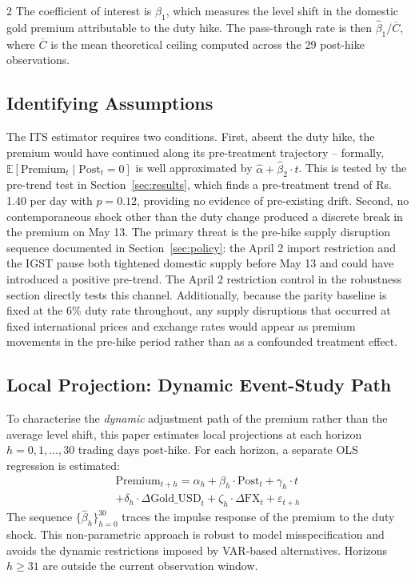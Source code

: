 \documentclass[12pt]{article}
\begin{document}
\begin{multicols}{2}
The coefficient of interest is $\beta_1$, which measures the level shift in the domestic gold premium attributable to the duty hike. The pass-through rate is then $\hat{\beta}_1 / \overline{C}$, where $\overline{C}$ is the mean theoretical ceiling computed across the 29 post-hike observations.

\subsection*{Identifying Assumptions}

The ITS estimator requires two conditions. First, absent the duty hike, the premium would have continued along its pre-treatment trajectory -- formally, $\mathbb{E}[\text{Premium}_t \mid \text{Post}_t = 0]$ is well approximated by $\hat{\alpha} + \hat{\beta}_2 \cdot t$. This is tested by the pre-trend test in Section~\ref{sec:results}, which finds a pre-treatment trend of Rs.\,1.40 per day with $p = 0.12$, providing no evidence of pre-existing drift. Second, no contemporaneous shock other than the duty change produced a discrete break in the premium on May 13. The primary threat is the pre-hike supply disruption sequence documented in Section~\ref{sec:policy}: the April 2 import restriction and the IGST pause both tightened domestic supply before May 13 and could have introduced a positive pre-trend. The April 2 restriction control in the robustness section directly tests this channel. Additionally, because the parity baseline is fixed at the 6\% duty rate throughout, any supply disruptions that occurred at fixed international prices and exchange rates would appear as premium movements in the pre-hike period rather than as a confounded treatment effect.

\subsection*{Local Projection: Dynamic Event-Study Path}

To characterise the \emph{dynamic} adjustment path of the premium rather than the average level shift, this paper estimates local projections \citep{Jorda2005} at each horizon $h = 0, 1, \ldots, 30$ trading days post-hike. For each horizon, a separate OLS regression is estimated:
\begin{equation}
\begin{split}
\text{Premium}_{t+h} = \alpha_h + \beta_h \cdot \text{Post}_t + \gamma_h \cdot t \\
+ \delta_h \cdot \Delta\text{Gold\_USD}_t + \zeta_h \cdot \Delta\text{FX}_t + \varepsilon_{t+h}
\end{split}
\label{eq:lp}
\end{equation}
The sequence $\{\hat{\beta}_h\}_{h=0}^{30}$ traces the impulse response of the premium to the duty shock. This non-parametric approach is robust to model misspecification and avoids the dynamic restrictions imposed by VAR-based alternatives. Horizons $h \geq 31$ are outside the current observation window.


\end{multicols}
\end{document}

